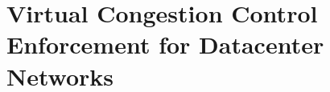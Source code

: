 
\chapter{Virtual Congestion Control Enforcement for Datacenter Networks}
\label{thesis:chapter:acdctcp}






%
%

